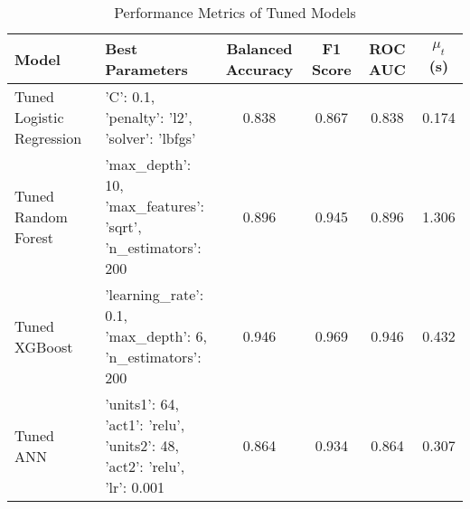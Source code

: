 \begin{table}[h!]
\centering
\caption{Performance Metrics of Tuned Models}
\label{tab:model_performance}
\begin{tabular}{llcccc}
\toprule
\textbf{Model} & \textbf{Best Parameters} & \textbf{Balanced Accuracy} & \textbf{F1 Score} & \textbf{ROC AUC} & $\mu_t$ (s) \\
\midrule
Tuned Logistic Regression & {'C': 0.1,\\ 'penalty': 'l2',\\ 'solver': 'lbfgs'} & 0.838 & 0.867 & 0.838 & 0.174 \\
Tuned Random Forest & {'max\_depth': 10,\\ 'max\_features': 'sqrt',\\ 'n\_estimators': 200} & 0.896 & 0.945 & 0.896 & 1.306 \\
Tuned XGBoost & {'learning\_rate': 0.1,\\ 'max\_depth': 6,\\ 'n\_estimators': 200} & 0.946 & 0.969 & 0.946 & 0.432 \\
Tuned ANN & {'units1': 64,\\ 'act1': 'relu',\\ 'units2': 48,\\ 'act2': 'relu',\\ 'lr': 0.001} & 0.864 & 0.934 & 0.864 & 0.307 \\
\bottomrule
\end{tabular}
\end{table}
